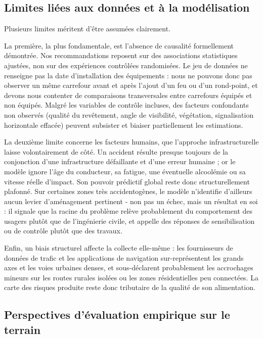 \documentclass[12pt, a4paper]{article}
\begin{document}
\subsection{Limites liées aux données et à la modélisation}

Plusieurs limites méritent d'être assumées clairement.

La première, la plus fondamentale, est l'absence de causalité formellement démontrée. Nos recommandations reposent sur des associations statistiques ajustées, non sur des expériences contrôlées randomisées. Le jeu de données ne renseigne pas la date d'installation des équipements : nous ne pouvons donc pas observer un même carrefour avant et après l'ajout d'un feu ou d'un rond-point, et devons nous contenter de comparaisons transversales entre carrefours équipés et non équipés. Malgré les variables de contrôle incluses, des facteurs confondants non observés (qualité du revêtement, angle de visibilité, végétation, signalisation horizontale effacée) peuvent subsister et biaiser partiellement les estimations.

La deuxième limite concerne les facteurs humains, que l'approche infrastructurelle laisse volontairement de côté. Un accident résulte presque toujours de la conjonction d'une infrastructure défaillante et d'une erreur humaine ; or le modèle ignore l'âge du conducteur, sa fatigue, une éventuelle alcoolémie ou sa vitesse réelle d'impact. Son pouvoir prédictif global reste donc structurellement plafonné. Sur certaines zones très accidentogènes, le modèle n'identifie d'ailleurs aucun levier d'aménagement pertinent - non pas un échec, mais un résultat en soi : il signale que la racine du problème relève probablement du comportement des usagers plutôt que de l'ingénierie civile, et appelle des réponses de sensibilisation ou de contrôle plutôt que des travaux.

Enfin, un biais structurel affecte la collecte elle-même : les fournisseurs de données de trafic et les applications de navigation sur-représentent les grands axes et les voies urbaines denses, et sous-déclarent probablement les accrochages mineurs sur les routes rurales isolées ou les zones résidentielles peu connectées. La carte des risques produite reste donc tributaire de la qualité de son alimentation.

\subsection{Perspectives d'évaluation empirique sur le terrain}
\end{document}
